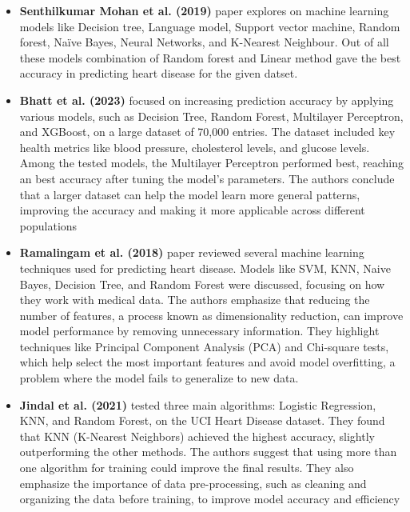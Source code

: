 \documentclass[12pt]{article}
\begin{document}
\begin{itemize}
\begin{table}[H]
\begin{center}
\begin{tabular}{cccc}
\end{tabular}
\end{center}
\end{table}



\item \textbf{Senthilkumar Mohan et al. (2019)} paper explores on machine learning models like Decision tree, Language model, Support vector machine, Random forest, Naïve Bayes, Neural Networks, and K-Nearest Neighbour. Out of all these models combination of Random forest and Linear method gave the best accuracy in predicting heart
disease for the given datset.


\item \textbf{Bhatt et al. (2023)} focused on increasing prediction accuracy by applying various models, such as Decision Tree, Random Forest, Multilayer Perceptron, and XGBoost, on a large dataset of 70,000 entries. The dataset included key health metrics like blood pressure, cholesterol levels, and glucose levels. Among the tested models, the Multilayer Perceptron performed best, reaching an best accuracy after tuning the model’s parameters. The authors conclude that a larger dataset can help the model learn more general patterns, improving the accuracy and making it more applicable across different populations 


\item \textbf{Ramalingam et al. (2018)} paper reviewed several machine learning techniques used for predicting heart disease. Models like SVM, KNN, Naive Bayes, Decision Tree, and Random Forest were discussed, focusing on how they work with medical data. The authors emphasize that reducing the number of features, a process known as dimensionality reduction, can improve model performance by removing unnecessary information. They highlight techniques like Principal Component Analysis (PCA) and Chi-square tests, which help select the most important features and avoid model overfitting, a problem where the model fails to generalize to new data.




\item \textbf{Jindal et al. (2021)} tested three main algorithms: Logistic Regression, KNN, and Random Forest, on the UCI Heart Disease dataset. They found that KNN (K-Nearest Neighbors) achieved the highest accuracy, slightly outperforming the other methods. The authors suggest that using more than one algorithm for training could improve the final results. They also emphasize the importance of data pre-processing, such as cleaning and organizing the data before training, to improve model accuracy
and efficiency



\end{itemize}
\end{document}
